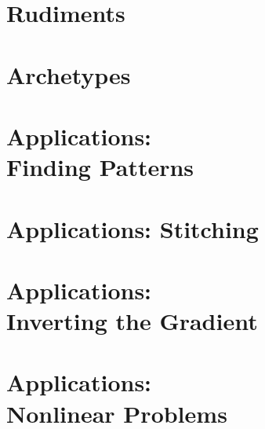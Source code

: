 \documentclass[10pt]{newsiambook}
\begin{document}
\mainmatter

\part{Rudiments}
%
%

\part{Archetypes}

%
%



\part{Applications:\\Finding Patterns}
%
%

\part{Applications: Stitching}
%

\part{Applications:\\Inverting the Gradient}
%

\part{Applications:\\Nonlinear Problems}
%
%
\end{document}
